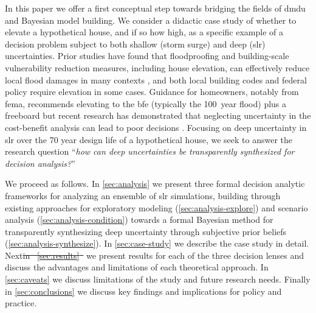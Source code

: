 \documentclass{agujournal2019}
\providecommand{\DIFadd}[1]{{\protect\color{blue}\uwave{#1}}} %
\providecommand{\DIFdel}[1]{{\protect\color{red}\sout{#1}}}                      %
\providecommand{\DIFaddbegin}{} %
\providecommand{\DIFaddend}{} %
\providecommand{\DIFdelbegin}{} %
\providecommand{\DIFdelend}{} %
\newcommand{\DIFscaledelfig}{0.5}
\newlength{\DIFdelgraphicswidth} %
\newlength{\DIFdelgraphicsheight} %
\newcommand{\DIFaddincludegraphics}[2][]{{\color{blue}\fbox{\DIFOincludegraphics[#1]{#2}}}} %
\newcommand{\DIFdelincludegraphics}[2][]{%
\sbox{\DIFdelgraphicsbox}{\DIFOincludegraphics[#1]{#2}}%
\settoboxwidth{\DIFdelgraphicswidth}{\DIFdelgraphicsbox} %
\settoboxtotalheight{\DIFdelgraphicsheight}{\DIFdelgraphicsbox} %
\scalebox{\DIFscaledelfig}{%
\parbox[b]{\DIFdelgraphicswidth}{\usebox{\DIFdelgraphicsbox}\\[-\baselineskip] \rule{\DIFdelgraphicswidth}{0em}}\llap{\resizebox{\DIFdelgraphicswidth}{\DIFdelgraphicsheight}{%
\setlength{\unitlength}{\DIFdelgraphicswidth}%
\begin{picture}(1,1)%
\thicklines\linethickness{2pt} %
{\color[rgb]{1,0,0}\put(0,0){\framebox(1,1){}}}%
{\color[rgb]{1,0,0}\put(0,0){\line( 1,1){1}}}%
{\color[rgb]{1,0,0}\put(0,1){\line(1,-1){1}}}%
\end{picture}%
}\hspace*{3pt}}} %
} %
\DeclareRobustCommand{\DIFaddbegin}{\DIFOaddbegin \let\includegraphics\DIFaddincludegraphics} %
\DeclareRobustCommand{\DIFaddend}{\DIFOaddend \let\includegraphics\DIFOincludegraphics} %
\DeclareRobustCommand{\DIFdelbegin}{\DIFOdelbegin \let\includegraphics\DIFdelincludegraphics} %
\DeclareRobustCommand{\DIFdelend}{\DIFOaddend \let\includegraphics\DIFOincludegraphics} %
\begin{document}
In this paper we offer a first conceptual step towards bridging the fields of \gls{dmdu} and Bayesian model building.
We consider a didactic case study of whether to elevate a hypothetical house, and if so how high, as a specific example of a decision problem subject to both shallow (storm surge) and deep (\gls{slr}) uncertainties.
Prior studies have found that floodproofing and building-scale vulnerability reduction measures, including house elevation, can effectively reduce local flood damages in many contexts \cite{demoel_reducing:2014,deruig_building:2020,kreibich_building:2005,slotter_floodproofing:2020,rozer_coping:2016,mobley_mitigation:2020,aerts_cost:2018}, and both local building codes \cite{asce_7-10:2013,bruneau_multihazard:2017,asce_24-05:2006} and federal policy \cite{FEMA_p-55:2011} require elevation in some cases.
Guidance for homeowners, notably from \gls{fema}, recommends elevating to the \gls{bfe} (typically the \SI{100}{year} flood) plus a freeboard \cite{fema_retrofitting:2014,asce_24-14:2015,fema_retrofitting:2014} but recent research has demonstrated that neglecting uncertainty in the cost-benefit analysis can lead to poor decisions \cite{zarekarizi_suboptimal:2020}.
Focusing on deep uncertainty in \gls{slr} over the 70 year design life of a hypothetical house, we seek to answer the research question ``\emph{how can deep uncertainties be transparently synthesized for decision analysis?}''

We proceed as follows.
In \cref{sec:analysis} we present three formal decision analytic frameworks for analyzing an ensemble of \gls{slr} simulations, building through existing approaches for exploratory modeling (\cref{sec:analysis-explore}) and scenario analysis (\cref{sec:analysis-condition}) towards a formal Bayesian method for transparently synthesizing deep uncertainty through subjective prior beliefs (\cref{sec:analysis-synthesize}).
In \cref{sec:case-study} we describe the case study in detail.
Next\DIFdelbegin \DIFdel{in \mbox{%
    \cref{sec:results} }\hspace{0pt}%
}\DIFdelend \DIFaddbegin \DIFadd{, in \mbox{%
    \cref{sec:results}}\hspace{0pt}%
  , }\DIFaddend we present results for each of the three decision lenses and discuss the advantages and limitations of each theoretical approach.
In \cref{sec:caveats} we discuss limitations of the study and future research needs.
Finally in \cref{sec:conclusions} we discuss key findings and implications for policy and practice.
\end{document}
